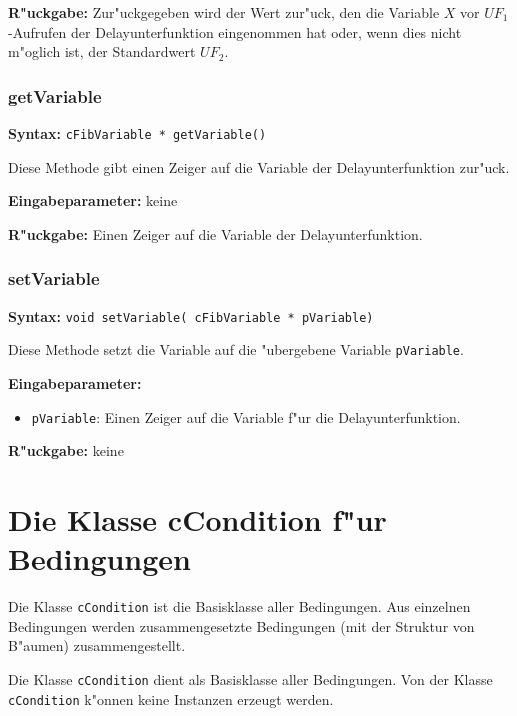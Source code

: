 \bigskip\noindent
\textbf{R"uckgabe:} Zur"uckgegeben wird der Wert zur"uck, den die Variable $X$ vor $UF_1$-Aufrufen der Delayunterfunktion eingenommen hat oder, wenn dies nicht m"oglich ist, der Standardwert $UF_2$.


\subsubsection{getVariable}

\textbf{Syntax:} \verb|cFibVariable * getVariable()|

\bigskip\noindent
Diese Methode gibt einen Zeiger auf die Variable der Delayunterfunktion zur"uck.

\bigskip\noindent
\textbf{Eingabeparameter:} keine

\bigskip\noindent
\textbf{R"uckgabe:} Einen Zeiger auf die Variable der Delayunterfunktion.


\subsubsection{setVariable}

\textbf{Syntax:} \verb|void setVariable( cFibVariable * pVariable)|

\bigskip\noindent
Diese Methode setzt die Variable auf die "ubergebene Variable \verb|pVariable|.

\bigskip\noindent
\textbf{Eingabeparameter:}
\begin{itemize}
 \item \verb|pVariable|: Einen Zeiger auf die Variable f"ur die Delayunterfunktion.
\end{itemize}

\bigskip\noindent
\textbf{R"uckgabe:} keine




\section{Die Klasse cCondition f"ur Bedingungen}
\label{secCCondition}

Die Klasse \verb|cCondition| ist die Basisklasse aller Bedingungen. Aus einzelnen Bedingungen werden zusammengesetzte Bedingungen (mit der Struktur von B"aumen) zusammengestellt.

Die Klasse \verb|cCondition| dient als Basisklasse aller Bedingungen. Von der Klasse \verb|cCondition| k"onnen keine Instanzen erzeugt werden.

